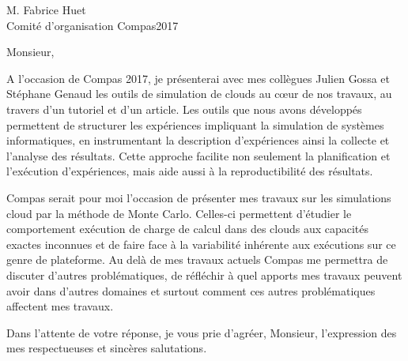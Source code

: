 \documentclass{letter}
\begin{document}
\begin{letter}{M. Fabrice Huet \\ Comité d'organisation Compas2017}

\opening{Monsieur,}

	A l'occasion de Compas 2017, je présenterai avec mes collègues Julien
	Gossa et Stéphane Genaud les outils de simulation de clouds au c\oe{}ur
	de nos travaux, au travers d'un tutoriel et d'un article. Les outils que
	nous avons développés permettent de structurer les expériences impliquant
	la simulation de systèmes informatiques, en instrumentant la description
	d'expériences ainsi la collecte et l'analyse des résultats. Cette approche
	facilite non seulement la planification et l'exécution d'expériences,
	mais aide aussi à la reproductibilité des résultats. 

	Compas serait pour moi l'occasion de présenter mes travaux sur les
	simulations cloud par la méthode de Monte Carlo. Celles-ci permettent
	d'étudier le comportement exécution de charge de calcul dans des clouds
	aux capacités exactes inconnues et de faire face à la variabilité
	inhérente aux exécutions sur ce genre de plateforme. Au delà de mes
	travaux actuels Compas me permettra de discuter d'autres problématiques,
	de réfléchir à quel apports mes travaux peuvent avoir dans d'autres
	domaines et surtout comment ces autres problématiques affectent mes
	travaux.

\closing{Dans l'attente de votre réponse, je vous prie d'agréer, Monsieur,
l'expression des mes respectueuses et sincères salutations.}


\end{letter}
\end{document}
